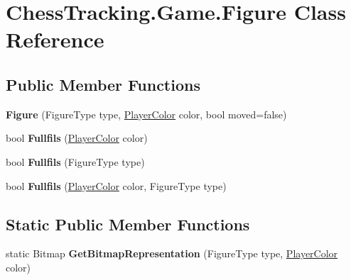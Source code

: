 \hypertarget{class_chess_tracking_1_1_game_1_1_figure}{}\section{Chess\+Tracking.\+Game.\+Figure Class Reference}
\label{class_chess_tracking_1_1_game_1_1_figure}
\subsection*{Public Member Functions}
\begin{DoxyCompactItemize}
\item 
\mbox{\label{class_chess_tracking_1_1_game_1_1_figure_afaf9ea4731954d37a172d88fc2b8143c}} 
{\bfseries Figure} (Figure\+Type type, \mbox{\hyperlink{namespace_chess_tracking_1_1_game_ab79070a55977a8c8326e9cdda7dcfa9a}{Player\+Color}} color, bool moved=false)
\item 
\mbox{\label{class_chess_tracking_1_1_game_1_1_figure_a91e32858ddd9c9672ec70eb745a113ae}} 
bool {\bfseries Fullfils} (\mbox{\hyperlink{namespace_chess_tracking_1_1_game_ab79070a55977a8c8326e9cdda7dcfa9a}{Player\+Color}} color)
\item 
\mbox{\label{class_chess_tracking_1_1_game_1_1_figure_a1e61bc5712e22a3b24d96232f47ef28e}} 
bool {\bfseries Fullfils} (Figure\+Type type)
\item 
\mbox{\label{class_chess_tracking_1_1_game_1_1_figure_aadfae3af17494e520dbbfd6046f9724d}} 
bool {\bfseries Fullfils} (\mbox{\hyperlink{namespace_chess_tracking_1_1_game_ab79070a55977a8c8326e9cdda7dcfa9a}{Player\+Color}} color, Figure\+Type type)
\end{DoxyCompactItemize}
\subsection*{Static Public Member Functions}
\begin{DoxyCompactItemize}
\item 
\mbox{\label{class_chess_tracking_1_1_game_1_1_figure_acc92119906056af917c756bbce8ae376}} 
static Bitmap {\bfseries Get\+Bitmap\+Representation} (Figure\+Type type, \mbox{\hyperlink{namespace_chess_tracking_1_1_game_ab79070a55977a8c8326e9cdda7dcfa9a}{Player\+Color}} color)
\end{DoxyCompactItemize}
